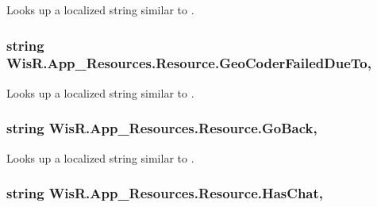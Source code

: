 Looks up a localized string similar to . 

\hypertarget{class_wis_r_1_1_app___resources_1_1_resource_a8525ce49131765342e2cfb591210c3f5}{}
\subsubsection[{Geo\+Coder\+Failed\+Due\+To}]{\setlength{\rightskip}{0pt plus 5cm}string Wis\+R.\+App\+\_\+\+Resources.\+Resource.\+Geo\+Coder\+Failed\+Due\+To\hspace{0.3cm}{\ttfamily [static]}, {\ttfamily [get]}}\label{class_wis_r_1_1_app___resources_1_1_resource_a8525ce49131765342e2cfb591210c3f5}


Looks up a localized string similar to . 

\hypertarget{class_wis_r_1_1_app___resources_1_1_resource_adc199eadb65736d04b73511d3eaa232d}{}
\subsubsection[{Go\+Back}]{\setlength{\rightskip}{0pt plus 5cm}string Wis\+R.\+App\+\_\+\+Resources.\+Resource.\+Go\+Back\hspace{0.3cm}{\ttfamily [static]}, {\ttfamily [get]}}\label{class_wis_r_1_1_app___resources_1_1_resource_adc199eadb65736d04b73511d3eaa232d}


Looks up a localized string similar to . 

\hypertarget{class_wis_r_1_1_app___resources_1_1_resource_ab724c7cb67510e7fbd6d2e4d863ed8d7}{}
\subsubsection[{Has\+Chat}]{\setlength{\rightskip}{0pt plus 5cm}string Wis\+R.\+App\+\_\+\+Resources.\+Resource.\+Has\+Chat\hspace{0.3cm}{\ttfamily [static]}, {\ttfamily [get]}}\label{class_wis_r_1_1_app___resources_1_1_resource_ab724c7cb67510e7fbd6d2e4d863ed8d7}


